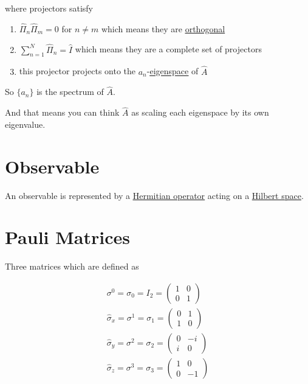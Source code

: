 \documentclass[
]{article}
\providecommand{\tightlist}{%
  \setlength{\itemsep}{0pt}\setlength{\parskip}{0pt}}
\let\oldhyperref\hyperref
\renewcommand{\hyperref}[2][]{\oldhyperref[#1]{\underline{#2}}}
\begin{document}
where projectors satisfy

\begin{enumerate}
	\def\labelenumi{\arabic{enumi}.}
	\tightlist
	\item
	      \(\hat{\Pi}_n\hat{\Pi}_m=0\) for \(n\neq m\) which means they are \hyperref[orthogonality]{orthogonal}
	\item
	      \(\sum_{n=1}^N \hat{\Pi}_n=\hat{I}\) which means they are a complete set of projectors
	\item this projector projects onto the \(a_n\)-\hyperref[eigenspaces]{eigenspace} of \(\hat{A}\)
\end{enumerate}

So \(\{a_n\}\) is the spectrum of \(\hat{A}\).

And that means you can think \(\hat{A}\) as scaling each eigenspace by its own eigenvalue.

\section{Observable}\label{observables}

An observable is represented by a \hyperref[hermitian-matrix]{Hermitian operator} acting on a \hyperref[hilbert-spaces]{Hilbert
	space}.

\section{Pauli Matrices}\label{pauli-matrices}

Three matrices which are defined as

\begin{gather*}
	\sigma^0=\sigma_0=I_2=\begin{pmatrix}1 & 0\\ 0 & 1\end{pmatrix}\\
	\hat{\sigma}_x=\sigma^1=\sigma_1=\begin{pmatrix}
		0 & 1 \\
		1 & 0
	\end{pmatrix}\\
	\hat{\sigma}_y=\sigma^2=\sigma_2=\begin{pmatrix}
		0 & -i \\
		i & 0
	\end{pmatrix}\\
	\hat{\sigma}_z=\sigma^3=\sigma_3=\begin{pmatrix}
		1 & 0  \\
		0 & -1
	\end{pmatrix}
\end{gather*}
\end{document}
